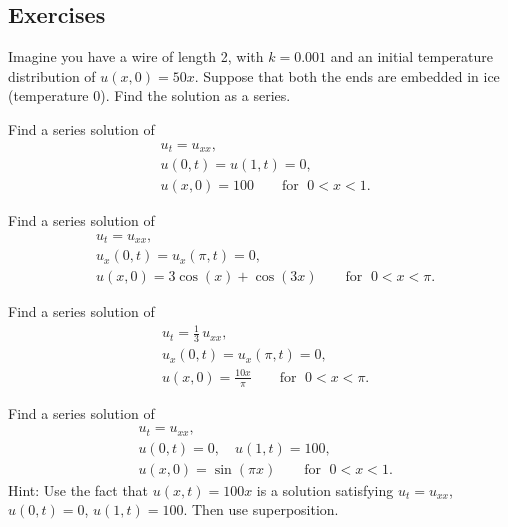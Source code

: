 \documentclass[12pt]{book}
\begin{document}

\subsection{Exercises}

\begin{exercise}
Imagine you have a wire of length 2, with $k=0.001$ and an initial
temperature distribution of $u(x,0) = 50 x$.  Suppose that both the ends
are embedded in ice (temperature 0).  Find the solution as a series.
\end{exercise}

\begin{exercise}
Find a series solution of
\begin{align*}
& u_t =  u_{xx} , \\
& u(0,t) = u(1,t) = 0 , \\
& u(x,0) = 100 \qquad \text{for } \; 0 < x < 1 .
\end{align*}
\end{exercise}

\begin{exercise}
Find a series solution of
\begin{align*}
& u_t =  u_{xx} , \\
& u_x(0,t) = u_x(\pi,t) = 0 , \\
& u(x,0) = 3\cos (x) + \cos (3x) \qquad \text{for } \; 0 < x < \pi .
\end{align*}
\end{exercise}

\begin{exercise} \label{heat:cosexr}
Find a series solution of
\begin{align*}
& u_t = \frac{1}{3} \, u_{xx} , \\
& u_x(0,t) = u_x(\pi,t) = 0 , \\
& u(x,0) = \frac{10x}{\pi} \qquad \text{for } \; 0 < x < \pi .
\end{align*}
\end{exercise}

\begin{exercise} \label{heat:oneto100exr}
Find a series solution of
\begin{align*}
& u_t =  u_{xx} , \\
& u(0,t) = 0 , \quad u(1,t) = 100 , \\
& u(x,0) = \sin (\pi x) \qquad \text{for } \; 0 < x < 1 .
\end{align*}
Hint: Use the fact that $u(x,t) = 100 x$ is a solution satisfying
$u_t = u_{xx}$, $u(0,t) = 0$, $u(1,t) = 100$.  Then use superposition.
\end{exercise}
\end{document}

